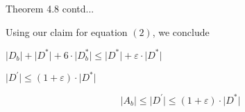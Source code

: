 \documentclass{beamer}
\begin{document}
\begin{frame}{Theorem 4.8 contd...}

\begin{exampleblock}
    

    
Using our claim for equation $(2)$, we conclude

    \vspace{0.5em}

    $\lvert D_b \rvert + \lvert D^* \rvert + 6 \cdot \lvert D_b^* \rvert \le \lvert D^* \rvert + \varepsilon \cdot \lvert D^* \rvert$

    \vspace{0.5em}

    $\lvert D^\prime \rvert \le ( 1 + \varepsilon ) \cdot \lvert D^* \rvert$

   

    \begin{equation}    
          \lvert A_b \rvert \le \lvert D^\prime \rvert \le ( 1 + \varepsilon ) \cdot \lvert D^* \rvert          
    \end{equation}
    

\end{exampleblock}

\end{frame}
\end{document}
